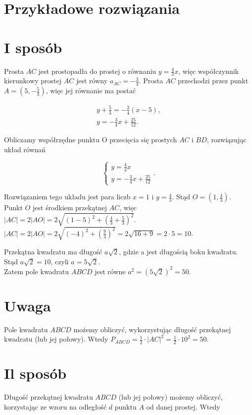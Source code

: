 \documentclass[10pt]{article}
\begin{document}
\section*{Przykładowe rozwiązania}
\section*{I sposób}
Prosta $A C$ jest prostopadła do prostej o równaniu $y=\frac{4}{3} x$, więc współczynnik kierunkowy prostej $A C$ jest równy $a_{A C}=-\frac{3}{4}$. Prosta $A C$ przechodzi przez punkt $A=\left(5,-\frac{5}{3}\right)$, więc jej równanie ma postać

$$
\begin{gathered}
y+\frac{5}{3}=-\frac{3}{4}(x-5), \\
y=-\frac{3}{4} x+\frac{25}{12} .
\end{gathered}
$$

Obliczamy współrzędne punktu O przecięcia się prostych $A C$ i $B D$, rozwiązując układ równań

$$
\left\{\begin{array}{c}
y=\frac{4}{3} x \\
y=-\frac{3}{4} x+\frac{25}{12}
\end{array} .\right.
$$

Rozwiązaniem tego układu jest para liczb $x=1$ i $y=\frac{4}{3}$. Stąd $O=\left(1, \frac{4}{3}\right)$.\\
Punkt $O$ jest środkiem przekątnej $A C$, więc $|A C|=2|A O|=2 \sqrt{(1-5)^{2}+\left(\frac{4}{3}+\frac{5}{3}\right)^{2}}$.\\
$|A C|=2|A O|=2 \sqrt{(-4)^{2}+\left(\frac{9}{3}\right)^{2}}=2 \sqrt{16+9}=2 \cdot 5=10$.

Przekątna kwadratu ma długość $a \sqrt{2}$, gdzie a jest długością boku kwadratu.\\
Stąd $a \sqrt{2}=10$, czyli $a=5 \sqrt{2}$.\\
Zatem pole kwadratu $A B C D$ jest równe $a^{2}=(5 \sqrt{2})^{2}=50$.

\section*{Uwaga}
Pole kwadratu $A B C D$ możemy obliczyć, wykorzystując długość przekątnej kwadratu (lub jej połowy). Wtedy $P_{A B C D}=\frac{1}{2} \cdot|A C|^{2}=\frac{1}{2} \cdot 10^{2}=50$.

\section*{Il sposób}
Długość przekątnej kwadratu $A B C D$ (lub jej połowy) możemy obliczyć, korzystając ze wzoru na odległość $d$ punktu $A$ od danej prostej. Wtedy
\end{document}
